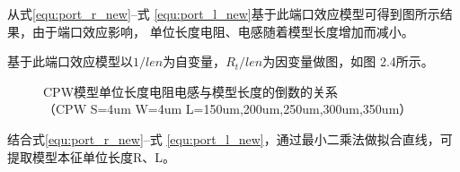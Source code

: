 从式\ref{equ:port_r_new}--式 \ref{equ:port_l_new}基于此端口效应模型可得到图\label{fig:unit_RL}所示结果，由于端口效应影响，
单位长度电阻、电感随着模型长度增加而减小。
\par
基于此端口效应模型以$1/len$为自变量，$R_t/len$为因变量做图，如图 2.4所示。
\begin{figure}[htb]\label{fig:1unit_RL}
\centering
 \hspace{0.1cm}
  \vspace{0.5cm}
  \centering
   \caption{CPW模型单位长度电阻电感与模型长度的倒数的关系\protect \\（CPW S=4um W=4um L=150um,200um,250um,300um,350um）}
\end{figure}

结合式\ref{equ:port_r_new}--式 \ref{equ:port_l_new}，通过最小二乘法做拟合直线，可提取模型本征单位长度\mbox{R、L}。

